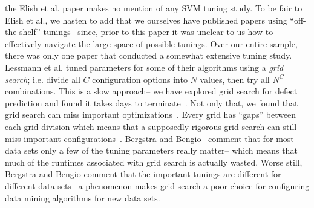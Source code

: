 the Elish et al. paper  makes no mention of any SVM tuning study.  
To be fair to Elish et al., we hasten to add that we
ourselves have  published
papers using ``off-the-shelf'' tunings~\cite{me07b} since,
prior to this paper it was unclear to us how to effectively
navigate the large space of possible tunings.
\ei
Over our entire sample, there was only  one paper that conducted a somewhat extensive tuning study.
Lessmann et al.\cite{lessmann2008benchmarking} tuned parameters for some of their algorithms using  a {\em grid search}; i.e. divide all $C$ configuration
options into $N$ values, then try all   $N^C$ combinations.
This is a slow approach-- we have explored grid search for 
defect prediction and found it takes days to terminate~\cite{me07b}.
Not only that, we found that grid search can miss
important optimizations~\cite{baker07}.
Every grid has ``gaps'' between each grid division which means
that a supposedly rigorous grid search can still miss
important configurations~\cite{Bergstra2012}. 
Bergstra and Bengio~\cite{Bergstra2012} comment that for most data sets only a few of the tuning parameters really matter-- which means that
much of the runtimes associated with grid search is actually wasted.
Worse still, Bergstra and Bengio  comment that 
the 
important tunings are   different   for different
data sets-- a 
 phenomenon makes grid search a poor choice for configuring data mining
 algorithms for new data sets. 
 



 





